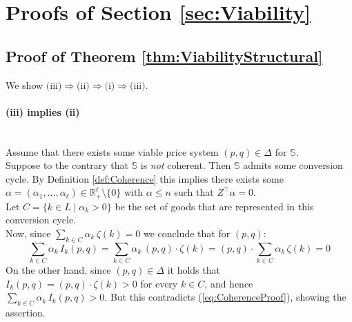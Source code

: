 \documentclass[11pt,fleqn]{article}
\begin{document}
\singlespace

\section{Proofs of Section \ref{sec:Viability}}\label{sec: app A}

\subsection{Proof of Theorem \ref{thm:ViabilityStructural}}\label{sec: app A1}

We show $\text{(iii)}\Rightarrow\text{(ii)}\Rightarrow\text{(i)}\Rightarrow\text{(iii)}$.

\paragraph{(iii) implies (ii)} \ \
\\
Assume that there exists some viable price system $(p,q) \in \Delta$ for $\mathbb S$. \\
Suppose to the contrary that $\mathbb S$ is \emph{not} coherent. Then $\mathbb S$ admits some conversion cycle. By Definition \ref{def:Coherence} this implies there exists some $\alpha = (\alpha_1, \ldots , \alpha_\ell ) \in \mathbb R^\ell_+ \setminus \{ 0 \}$ with $\alpha \leqslant n$ such that  $Z^\top \alpha =0$. \\
Let $C = \{ k \in L \mid \alpha_k >0 \}$ be the set of goods that are represented in this conversion cycle. \\
Now, since $\sum_{k \in C} \alpha_k \, \zeta (k) =0$ we conclude that for $(p,q) \colon$
\begin{equation} \label{eq:CoherenceProof}
\sum_{k \in C} \alpha_k \, I_k (p,q) = \sum_{k \in C} \alpha_k \, (p,q) \cdot \zeta (k) = (p,q) \cdot \sum_{k \in C} \alpha_k \, \zeta (k) =0
\end{equation}
On the other hand, since $(p,q) \in \Delta$ it holds that $I_k (p,q) = (p,q) \cdot \zeta (k) >0$ for every $k \in C$, and hence $\sum_{k \in C} \alpha_k \, I_k (p,q) >0$. But this contradicts (\ref{eq:CoherenceProof}), showing the assertion.
\end{document}

